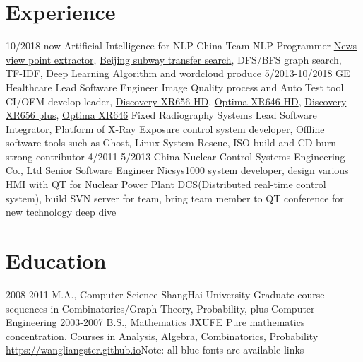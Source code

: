 \documentclass[letterpaper,10pt]{Resume_Liang}
\begin{document}
\begin{body}

\section{Experience}
\begin{entrylist}
  \entry
    {10/2018-now}
    {Artificial-Intelligence-for-NLP China Team}
    {NLP Programmer}
    {\href{https://github.com/wangliangster/TestWL/blob/master/ViewPointExtract.ipynb}{News view point extractor}, \href{https://github.com/wangliangster/NLP-Course/blob/master/BeijingSubway.ipynb}{Beijing subway transfer search}, DFS/BFS graph search, TF-IDF, Deep Learning Algorithm and \href{https://github.com/wangliangster/TestWL/blob/master/wordcloudLiang.ipynb}{wordcloud} produce }	
  \entry
    {5/2013-10/2018}
    {GE Healthcare}
    {Lead Software Engineer}
    {Image Quality process and Auto Test tool  CI/OEM develop leader, \href{https://www.gehealthcare.com/en/products/radiography/fixed-rad-systems/discovery-xr656-hd-x-ray-system-powered-by-helix}{Discovery XR656 HD}, \href{https://www.gehealthcare.com/en/products/radiography/fixed-rad-systems/optima-xr646-hd-x-ray-system-powered-by-helix}{Optima XR646 HD}, \href{https://www.gehealthcare.com/en/products/radiography/fixed-rad-systems/discovery-xr656-plus}{Discovery XR656 plus}, \href{https://www.gehealthcare.com/en/products/radiography/fixed-rad-systems/optima-xr646}{Optima XR646} Fixed Radiography Systems Lead Software Integrator, Platform of X-Ray Exposure control system developer, Offline software tools such as Ghost, Linux System-Rescue, ISO build and CD burn strong contributor}
  \entry
    {4/2011-5/2013}
    {China Nuclear Control Systems Engineering Co., Ltd}
    {Senior Software Engineer}
    {Nicsys1000 system developer, design various HMI with QT for Nuclear Power Plant DCS(Distributed real-time control system), build SVN server for team, bring team member to QT conference for new technology deep dive }
\end{entrylist}

\section{Education}
\begin{entrylist}
  \entry
    {2008-2011}
    {M.A., Computer Science}
    {ShangHai University}
    {Graduate course sequences in Combinatorics/Graph Theory, Probability, plus Computer Engineering }
  \entry
    {2003-2007}
    {B.S., Mathematics}
    {JXUFE}
    {Pure mathematics concentration. Courses in Analysis, Algebra, Combinatorics, Probability}
   {\href{https://wangliangster.github.io}{https://wangliangster.github.io}}{Note: all blue fonts are available links}{}
\end{entrylist}


\end{body}
\end{document}

